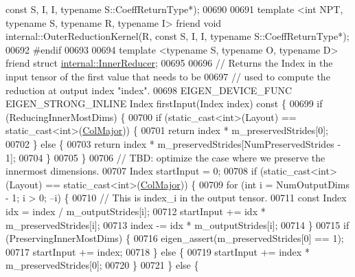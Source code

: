 \begin{DoxyCode}
{      const} S, I, I, \textcolor{keyword}{typename} S::CoeffReturnType*);
00690 
00691   \textcolor{keyword}{template} <\textcolor{keywordtype}{int} NPT, \textcolor{keyword}{typename} S, \textcolor{keyword}{typename} R, \textcolor{keyword}{typename} I> \textcolor{keyword}{friend} \textcolor{keywordtype}{void} internal::OuterReductionKernel(R, \textcolor{keyword}{
      const} S, I, I, \textcolor{keyword}{typename} S::CoeffReturnType*);
00692 \textcolor{preprocessor}{#endif}
00693 
00694   \textcolor{keyword}{template} <\textcolor{keyword}{typename} S, \textcolor{keyword}{typename} O, \textcolor{keyword}{typename} D> \textcolor{keyword}{friend} \textcolor{keyword}{struct }
      \hyperlink{struct_eigen_1_1internal_1_1_inner_reducer}{internal::InnerReducer};
00695 
00696   \textcolor{comment}{// Returns the Index in the input tensor of the first value that needs to be}
00697   \textcolor{comment}{// used to compute the reduction at output index "index".}
00698   EIGEN\_DEVICE\_FUNC EIGEN\_STRONG\_INLINE Index firstInput(Index index)\textcolor{keyword}{ const }\{
00699     \textcolor{keywordflow}{if} (ReducingInnerMostDims) \{
00700       \textcolor{keywordflow}{if} (static\_cast<int>(Layout) == static\_cast<int>(\hyperlink{group__enums_ggaacded1a18ae58b0f554751f6cdf9eb13a0cbd4bdd0abcfc0224c5fcb5e4f6669a}{ColMajor})) \{
00701         \textcolor{keywordflow}{return} index * m\_preservedStrides[0];
00702       \} \textcolor{keywordflow}{else} \{
00703         \textcolor{keywordflow}{return} index * m\_preservedStrides[NumPreservedStrides - 1];
00704       \}
00705     \}
00706     \textcolor{comment}{// TBD: optimize the case where we preserve the innermost dimensions.}
00707     Index startInput = 0;
00708     \textcolor{keywordflow}{if} (static\_cast<int>(Layout) == static\_cast<int>(\hyperlink{group__enums_ggaacded1a18ae58b0f554751f6cdf9eb13a0cbd4bdd0abcfc0224c5fcb5e4f6669a}{ColMajor})) \{
00709       \textcolor{keywordflow}{for} (\textcolor{keywordtype}{int} i = NumOutputDims - 1; i > 0; --i) \{
00710         \textcolor{comment}{// This is index\_i in the output tensor.}
00711         \textcolor{keyword}{const} Index idx = index / m\_outputStrides[i];
00712         startInput += idx * m\_preservedStrides[i];
00713         index -= idx * m\_outputStrides[i];
00714       \}
00715       \textcolor{keywordflow}{if} (PreservingInnerMostDims) \{
00716         eigen\_assert(m\_preservedStrides[0] == 1);
00717         startInput += index;
00718       \} \textcolor{keywordflow}{else} \{
00719         startInput += index * m\_preservedStrides[0];
00720       \}
00721     \} \textcolor{keywordflow}{else} \{

\end{DoxyCode}
